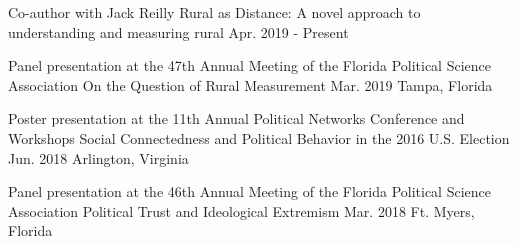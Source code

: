 

\begin{cventries}



\cventry
  {Co-author with Jack Reilly} %
  {Rural as Distance: A novel approach to understanding and measuring rural} %
  {Apr. 2019 - Present} %
  {} %
  {}

\vspace{-.25cm}
\cventry
  {Panel presentation at the 47th Annual Meeting of the Florida Political Science Association} %
  {On the Question of Rural Measurement} %
  {Mar. 2019} %
  {Tampa, Florida} %
  {}

\vspace{-.25cm}
\cventry
  {Poster presentation at the 11th Annual Political Networks Conference and Workshops} %
  {Social Connectedness and Political Behavior in the 2016 U.S. Election} %
  {Jun. 2018} %
  {Arlington, Virginia} %
  {}

\vspace{-.25cm}
\cventry
  {Panel presentation at the 46th Annual Meeting of the Florida Political Science Association} %
  {Political Trust and Ideological Extremism} %
  {Mar. 2018} %
  {Ft. Myers, Florida} %
  {}

\vspace{-.25cm}


\end{cventries}
